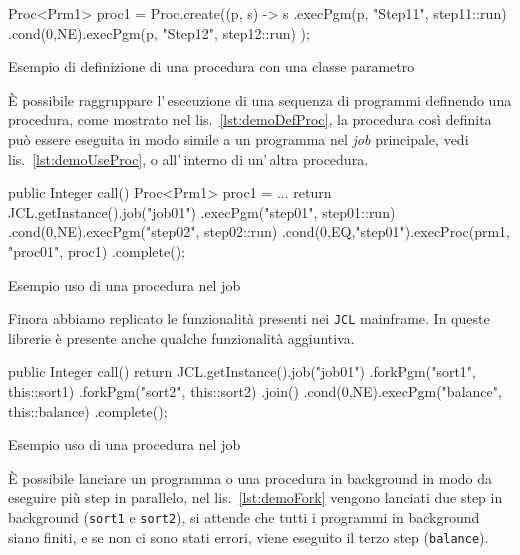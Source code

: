 \begin{elisting}[!htb]
    \begin{javacode}
        Proc<Prm1> proc1 = Proc.create((p, s) -> s
        .execPgm(p, "Step11", step11::run)
        .cond(0,NE).execPgm(p, "Step12", step12::run)
    );
    \end{javacode}
    \caption{Esempio di definizione di una procedura con una classe parametro}
    \label{lst:demoDefProc}
\end{elisting}
È possibile raggruppare l'\,esecuzione di una sequenza di programmi definendo
una procedura, come mostrato nel lis.~\ref{lst:demoDefProc}, la procedura così
definita può essere eseguita in modo simile a un programma nel \textit{job}
principale, vedi lis.~\ref{lst:demoUseProc}, o all'\,interno di un'\,altra
procedura.
\begin{elisting}[!htb]
    \begin{javacode}
        public Integer call() {
    Proc<Prm1> proc1 = ...
    return JCL.getInstance().job("job01")
        .execPgm("step01", step01::run)
        .cond(0,NE).execPgm("step02", step02::run)
        .cond(0,EQ,"step01").execProc(prm1, "proc01", proc1)
        .complete();
}
    \end{javacode}
    \caption{Esempio uso di una procedura nel job}
    \label{lst:demoUseProc}
\end{elisting}

Finora abbiamo replicato le funzionalità presenti nei \texttt{JCL} mainframe.
In queste librerie è presente anche qualche funzionalità aggiuntiva.

\begin{elisting}[!htb]
    \begin{javacode}
        public Integer call() {
    return JCL.getInstance().job("job01")
        .forkPgm("sort1", this::sort1)
        .forkPgm("sort2", this::sort2)
        .join()
        .cond(0,NE).execPgm("balance", this::balance)
        .complete();
}
    \end{javacode}
    \caption{Esempio uso di una procedura nel job}
    \label{lst:demoFork}
\end{elisting}
È possibile lanciare un programma o una procedura in background in modo da
eseguire più step in parallelo, nel lis.~\ref{lst:demoFork} vengono lanciati due
step in background (\texttt{sort1} e \texttt{sort2}), si attende che tutti i
programmi in background siano finiti, e se non ci sono stati errori, viene
eseguito il terzo step (\texttt{balance}).


